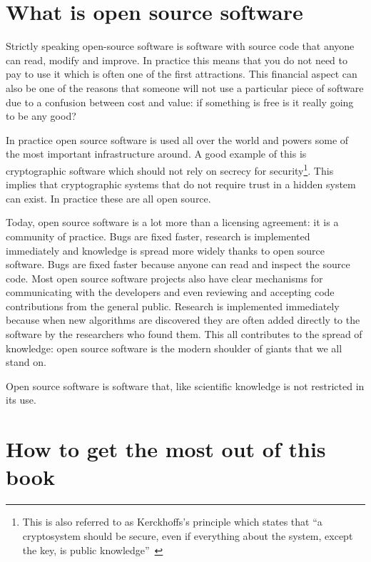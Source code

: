 \section{What is open source software}
\label{sec:what-is-open-source-software}

Strictly speaking open-source software is software
with source code that anyone can read, modify and improve. In practice this
means that you do not need to pay to use it which is often one of the first
attractions.
This financial aspect can also be one of the reasons that someone will
not use a particular piece of software due to a confusion between cost
and value: if something is free is it really going to be any good?

In practice open source software is used all over the world and powers
some of the most important infrastructure around.
A good example of this is cryptographic software which should not rely on
secrecy for security\footnote{This
is also referred to as Kerckhoffs's principle which states
that ``a cryptosystem should be secure, even if everything about the system,
except the key, is public knowledge''~\cite{kerckhoffs1883cryptographie}}. This
implies that cryptographic systems that do not require trust in a hidden system
can exist.
In practice these are all open source.

Today, open source software is a lot more than a licensing agreement:
it is a community of practice. Bugs are fixed faster, research is
implemented immediately and knowledge is spread more widely thanks to
open source software. Bugs are fixed faster because anyone can read and
inspect the source code. Most open source software projects also have
clear mechanisms for communicating with the developers and even
reviewing and accepting code contributions from the general public.
Research is implemented immediately because when new algorithms are
discovered they are often added directly to the software by the
researchers who found them. This all contributes to the spread of
knowledge: open source software is the modern shoulder of giants that
we all stand on.

Open source software is software that, like scientific knowledge is not
restricted in its use.

\section{How to get the most out of this
book}\label{sec:how-to-get-the-most-out-of-this-book}

